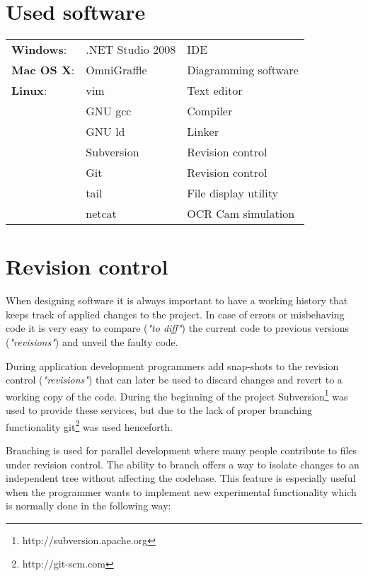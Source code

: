 \documentclass[oneside,bachelor,etd]{BYUPhys}
\begin{document}

\section{Used software}
\label{sec:2usedsw}

\begin{tabular} { l l l }
	\textbf{Windows}:	&	.NET Studio 2008		&	IDE								\\
	\textbf{Mac OS X}:	&	OmniGraffle				&	Diagramming software	\\
	\textbf{Linux}:			&	vim							&	Text editor 					\\
									&	GNU gcc					&	Compiler						\\
									&	GNU ld						&	Linker							\\
									&	Subversion				&	Revision control			\\
									&	Git							&	Revision control			\\
									&	tail							&	File display utility		\\
									&	netcat						&	OCR Cam simulation	\\
\end{tabular}


\section{Revision control}
\label{sec:2revcontrol}

When designing software it is always important to have a working history that keeps track of applied changes to the project.
In case of errors or misbehaving code it is very easy to compare (\textit{"to diff"}) the current code to previous versions (\textit{"revisions"})
and unveil the faulty code. 
\par During application development programmers add snap-shots to the revision control (\textit{"revisions"}) 
that can later be used to discard changes and revert to a working copy of the code. During the beginning of the project 
Subversion\footnote{\label{Apache:2} http://subversion.apache.org} was used to provide these services, 
but due to the lack of proper branching functionality git\footnote{\label{git:3} http://git-scm.com} was used henceforth.
\par Branching is used for parallel development where many people contribute to files under revision control.
The ability to branch offers a way to isolate changes to an independent tree without affecting the codebase. 
This feature is especially useful when the programmer wants to implement new experimental functionality which is normally done in the following way:
\end{document}
